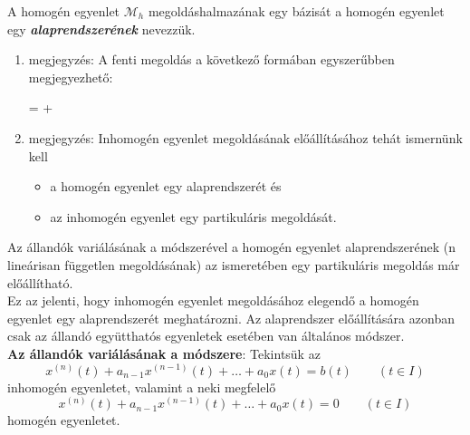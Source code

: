 \documentclass[12pt,margin=0px]{article}
\begin{document}
    \noindent A homogén egyenlet $\mathcal{M}_{h}$ megoldáshalmazának egy bázisát a homogén egyenlet egy \textbf{\emph{alaprendszerének}} nevezzük.\\
    \begin{enumerate}
        \item megjegyzés: A fenti megoldás a következő formában egyszerűbben megjegyezhető:
        \begin{center}
             =  + 
        \end{center}
        \item megjegyzés: Inhomogén egyenlet megoldásának előállításához tehát ismernünk kell
        \begin{itemize}
            \item a homogén egyenlet egy alaprendszerét és
            \item az inhomogén egyenlet egy partikuláris megoldását.
        \end{itemize}
    \end{enumerate}

    \noindent Az állandók variálásának a módszerével a homogén egyenlet alaprendszerének (n lineárisan független megoldásának) az ismeretében egy partikuláris megoldás már előállítható.\\

    \noindent Ez az jelenti, hogy inhomogén egyenlet megoldásához elegendő a homogén egyenlet egy alaprendszerét meghatározni. Az alaprendszer előállítására azonban csak az állandó együtthatós egyenletek esetében van általános módszer.\\

    \noindent \textbf{Az állandók variálásának a módszere}: Tekintsük az
    \[
        x^{(n)}(t) + a_{n-1}x^{(n-1)}(t) + \ldots + a_{0}x(t) = b(t) \qquad (t \in I)
    \]
    inhomogén egyenletet, valamint a neki megfelelő
    \[
        x^{(n)}(t) + a_{n-1}x^{(n-1)}(t) + \ldots + a_{0}x(t) = 0 \qquad (t \in I)
    \]
    homogén egyenletet.
\end{document}
